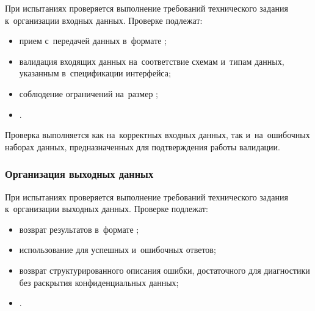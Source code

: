 \documentclass[12pt,a4paper]{extarticle}
\begin{document}
\begin{hseExample}
При испытаниях проверяется выполнение требований технического задания к~организации входных данных. Проверке подлежат:

\begin{itemize}[leftmargin=1.25cm]
    \item прием  с~передачей данных в~формате ;
    \item валидация входящих данных на~соответствие схемам и~типам данных, указанным в~спецификации интерфейса;
    \item соблюдение ограничений на~размер ;
    \item {}.
\end{itemize}

Проверка выполняется как на~корректных входных данных, так и~на~ошибочных наборах данных, предназначенных для подтверждения работы валидации.
\end{hseExample}

\subsubsection{Организация выходных данных}

\begin{hseExample}
При испытаниях проверяется выполнение требований технического задания к~организации выходных данных. Проверке подлежат:

\begin{itemize}[leftmargin=1.25cm]
    \item возврат результатов в~формате ;
    \item использование  для успешных и~ошибочных ответов;
    \item возврат структурированного описания ошибки, достаточного для диагностики без раскрытия конфиденциальных данных;
    \item {}.
\end{itemize}
\end{hseExample}
\end{document}
